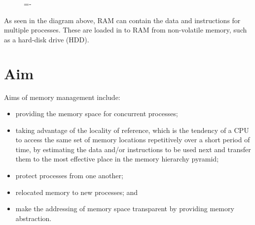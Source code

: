 \documentclass[a4paper]{systems-software}
\begin{document}
\begin{figure}[H]
  \lineskip=-\fboxrule
\end{figure}

As seen in the diagram above, RAM can contain the data and instructions for multiple processes. These are loaded in to RAM from non-volatile memory, such as a hard-disk drive (HDD).


\section*{Aim}

Aims of memory management include:
\begin{itemize}
	\item providing the memory space for concurrent processes;
	\item taking advantage of the locality of reference, which is the tendency of a CPU to access the same set of memory locations repetitively over a short period of time, by estimating the data and/or instructions to be used next and transfer them to the most effective place in the memory hierarchy pyramid;
	\item protect processes from one another;
	\item relocated memory to new processes; and
	\item make the addressing of memory space transparent by providing memory abstraction.
\end{itemize}
\end{document}
